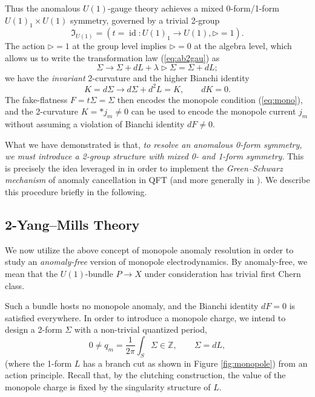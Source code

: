 \documentclass[onecolumn]{article}
\theoremstyle{theorem}
\theoremstyle{remark}
\theoremstyle{example}
\theoremstyle{definition}
\numberwithin{equation}{section}
\def\bbZ{\mathbb{Z}}
\begin{document}
Thus the anomalous $U(1)$-gauge theory achieves a mixed 0-form/1-form $U(1)_1\times U(1)$ symmetry, governed by a trivial 2-group \begin{equation}
    \mathfrak{I}_{U(1)} = (t=\operatorname{id}:U(1)_1\rightarrow U(1),\rhd = 1).\label{trivu1}
\end{equation} 
{The} action $\rhd = 1$ at the group level implies $\rhd = 0$ at the algebra level, which allows us to write the transformation law  (\ref{eq:ab2gau}) as
\begin{equation}
    \Sigma \rightarrow \Sigma + dL + \lambda\rhd \Sigma = \Sigma + dL;\nonumber
\end{equation}
we have the \textit{{invariant}} 2-curvature and the higher Bianchi identity
\begin{equation}
    K = d\Sigma \rightarrow d\Sigma + d^2L = K,\qquad dK = 0.\nonumber
\end{equation}
{The} fake-flatness $F = t\Sigma = \Sigma$ then encodes the monopole condition  (\ref{eq:mono}), and the 2-curvature $K = \ast j_m\neq 0$ can be used to encode the monopole current $j_m$ without assuming a violation of Bianchi identity $dF\neq 0$.

What we have demonstrated is that, \textit{{to resolve an anomalous 0-form symmetry, we must introduce a 2-group structure with mixed 0- and 1-form symmetry}}. This is precisely the idea leveraged in \cite{Cordova:2018cvg} in order to implement the {\it {Green--Schwarz mechanism}} of anomaly cancellation in QFT (and more generally in \cite{Sati:2008eg,Fiorenza:2020iax}). We describe this procedure briefly in the following.


\subsection{2-Yang--Mills Theory} 
We now utilize the above concept of monopole anomaly resolution in order to study an \textit{{anomaly-free}} version of monopole electrodynamics. By anomaly-free, we mean that the $U(1)$-bundle $P\rightarrow X$ under consideration has trivial first Chern class. 

Such a bundle hosts no monopole anomaly, and the Bianchi identity $dF =0$ is satisfied everywhere. In order to introduce a monopole charge, we intend to design a 2-form $\Sigma$ with a non-trivial quantized period,
\begin{equation}
    0\neq q_m = \frac{1}{2\pi}\int_S \Sigma \in\bbZ,\qquad \Sigma=dL, \label{monoperiod}
\end{equation}
(where the 1-form $L$ has a branch cut as shown in Figure \ref{fig:monopole}) from an action principle. Recall that, by the clutching construction, the value of the monopole charge is fixed by the singularity structure of $L$.
\end{document}
